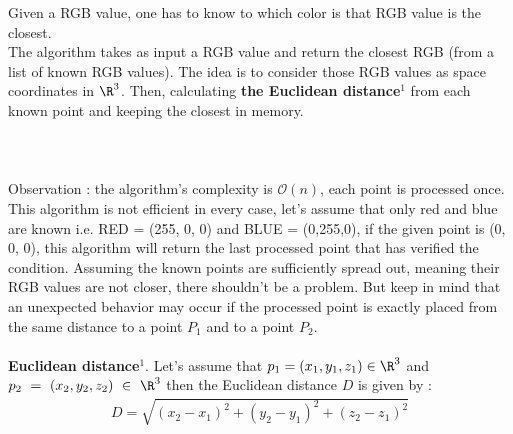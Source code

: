 \documentclass[a4paper, 12pt]{article}
\begin{document}
Given a RGB value, one has to know to which color is that RGB value is the closest.\\
The algorithm takes as input a RGB value and return the closest RGB (from a list of known RGB values). The idea is to consider those RGB values as space coordinates in $\R^3$. Then, calculating \textbf{the Euclidean distance}$^1$ from each known point and keeping the closest in memory.
\\ \\
\\ \\
Observation : the algorithm's complexity is $\mathscr{O}(n)$, each point is processed once. This algorithm is not efficient in every case, let's assume that only red and blue are known i.e. RED = (255, 0, 0) and BLUE = (0,255,0), if the given point is (0, 0, 0), this algorithm will return the last processed point that has verified the condition. Assuming the known points are sufficiently spread out, meaning their RGB values are not closer, there shouldn't be a problem. But keep in mind that an unexpected behavior may occur if the processed point is exactly placed from the same distance to a point $P_1$ and to a point $P_2$.
\\ \\
\textbf{Euclidean distance}$^1$. Let's assume that $p_1 = (x_1, y_1, z_1) \in \R^3$ and\\$p_2~=~(x_2, y_2, z_2)~\in~\R^3$ then the Euclidean distance $D$ is given by :
\begin{align}
D = \sqrt{(x_2 - x_1)^2 + (y_2 - y_1)^2 + (z_2 - z_1)^2}
\end{align}
\end{document}
